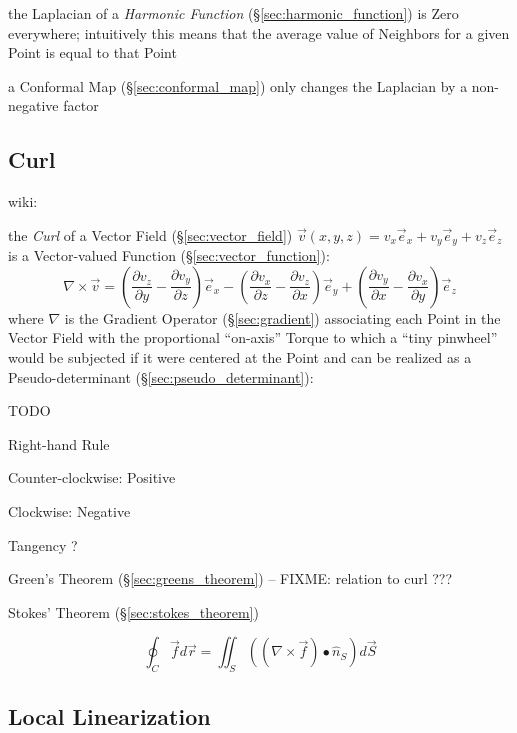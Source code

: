 the Laplacian of a \emph{Harmonic Function} (\S\ref{sec:harmonic_function}) is
Zero everywhere; intuitively this means that the average value of Neighbors for
a given Point is equal to that Point

a Conformal Map (\S\ref{sec:conformal_map}) only changes the Laplacian by a
non-negative factor



\subsection{Curl}\label{sec:curl}

wiki:

the \emph{Curl} of a Vector Field (\S\ref{sec:vector_field}) $\vec{v}(x,y,z) =
v_x\vec{e}_x + v_y\vec{e}_y + v_z\vec{e}_z$ is a Vector-valued Function
(\S\ref{sec:vector_function}):
\[
  \nabla\times\vec{v} =
    (\frac{\partial v_z}{\partial y}-\frac{\partial v_y}{\partial z})\vec{e}_x -
    (\frac{\partial v_x}{\partial z}-\frac{\partial v_z}{\partial x})\vec{e}_y +
    (\frac{\partial v_y}{\partial x}-\frac{\partial v_x}{\partial y})\vec{e}_z
\]
where $\nabla$ is the Gradient Operator (\S\ref{sec:gradient}) associating each
Point in the Vector Field with the proportional ``on-axis'' Torque to which a
``tiny pinwheel'' would be subjected if it were centered at the Point and can
be realized as a Pseudo-determinant (\S\ref{sec:pseudo_determinant}):

TODO

Right-hand Rule

Counter-clockwise: Positive

Clockwise: Negative

Tangency ?

Green's Theorem (\S\ref{sec:greens_theorem}) -- FIXME: relation to curl ???

Stokes' Theorem (\S\ref{sec:stokes_theorem})

\[
  \oint_C \vec{f} d\vec{r}
    = \iint_S ((\nabla \times \vec{f}) \bullet \hat{n}_S) d\vec{S}
\]



\subsection{Local Linearization}\label{sec:linearization}

